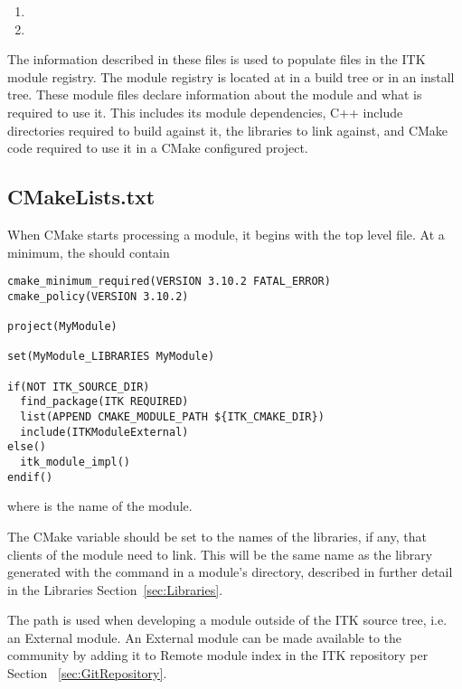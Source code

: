 \begin{enumerate}
  \item {}
  \item {}
\end{enumerate}

The information described in these files is used to populate 
files in the ITK module registry. The module registry is located
at  in a
build tree or
in an install tree. These module files declare information about the module
and what is required to use it. This includes its module dependencies, C++ include
directories required to build against it, the libraries to link against, and CMake
code required to use it in a CMake configured project.


\subsection{CMakeLists.txt}

When CMake starts processing a module, it begins with the top level
 file. At a minimum, the  should
contain

\begin{verbatim}
cmake_minimum_required(VERSION 3.10.2 FATAL_ERROR)
cmake_policy(VERSION 3.10.2)

project(MyModule)

set(MyModule_LIBRARIES MyModule)

if(NOT ITK_SOURCE_DIR)
  find_package(ITK REQUIRED)
  list(APPEND CMAKE_MODULE_PATH ${ITK_CMAKE_DIR})
  include(ITKModuleExternal)
else()
  itk_module_impl()
endif()
\end{verbatim}

where  is the name of the module.

The CMake variable  should be set to the names
of the libraries, if any, that clients of the module need to link. This will be
the same name as the library generated with the  command in
a module's  directory, described in further detail in the Libraries
Section~\ref{sec:Libraries}.

The path  is used when developing a module outside of the
ITK source tree, i.e. an External module. An External module can be made
available to the community by adding it to 
Remote module index in the ITK repository per Section ~\ref{sec:GitRepository}.

